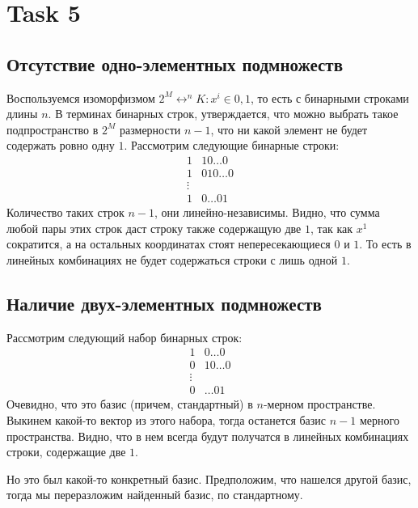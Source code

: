 \section{Task 5}
\subsection{Отсутствие одно-элементных подмножеств}
Воспользуемся изоморфизмом $2^M \longleftrightarrow ^{n}K : x^i \in {0, 1}$, то есть с бинарными строками длины $n$.
В терминах бинарных строк, утверждается, что можно выбрать такое подпространство в $2^M$ размерности $n - 1$, что ни какой элемент не будет содержать ровно одну $1$.
Рассмотрим следующие бинарные строки:
\begin{align}
    1 & 1 0   \ldots 0 \\
    1 & 0 1 0 \ldots 0 \\
    \vdots \\
    1 & 0 \ldots 0 1
\end{align}
Количество таких строк $n - 1$, они линейно-независимы.
Видно, что сумма любой пары этих строк даст строку также содержащую две $1$, так как $x^1$ сократится, а на остальных координатах стоят непересекающиеся $0$ и $1$. То есть в линейных комбинациях не будет содержаться строки с лишь одной $1$.

\subsection{Наличие двух-элементных подмножеств}
Рассмотрим следующий набор бинарных строк:
\begin{align}
    1 & 0   \ldots 0 \\
    0 & 1 0 \ldots 0 \\
    \vdots \\
    0 & \ldots 0 1
\end{align}
Очевидно, что это базис (причем, стандартный) в $n$-мерном пространстве.
Выкинем какой-то вектор из этого набора, тогда останется базис $n-1$ мерного пространства.
Видно, что в нем всегда будут получатся в линейных комбинациях строки, содержащие две $1$.

Но это был какой-то конкретный базис. Предположим, что нашелся другой базис, тогда мы переразложим найденный базис, по стандартному.
